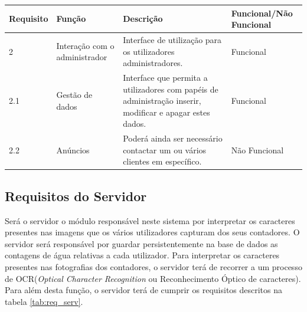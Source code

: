 \begin{center}
\begin{tabular}[c]{||p{1.5cm} | p{3cm} | p{6cm} | p{2.5cm}||} 
\hline
Requisito & Função & Descrição & Funcional/Não Funcional\\ %
\hline\hline
2 & Interação com o administrador & Interface de utilização para os utilizadores administradores. & Funcional\\ 
\hline
2.1 & Gestão de dados & Interface que permita a utilizadores com papéis de administração inserir, modificar e apagar estes dados. & Funcional\\
\hline
2.2 & Anúncios & Poderá ainda ser necessário contactar um ou vários clientes em específico. & Não Funcional\\
\hline
\end{tabular}
\label{tab:req_admin}
\end{center}

\subsection{Requisitos do Servidor}
 
Será o servidor o módulo responsável neste sistema por interpretar os caracteres presentes nas imagens que os vários utilizadores capturam dos seus contadores.
O servidor será responsável por guardar persistentemente na base de dados as contagens de água relativas a cada utilizador.
Para interpretar os caracteres presentes nas fotografias dos contadores, o servidor terá de recorrer a um processo de OCR({\it{Optical Character Recognition}} ou Reconhecimento Óptico de caracteres).
Para além desta função, o servidor terá de cumprir os requisitos descritos na tabela \ref{tab:req_serv}.

